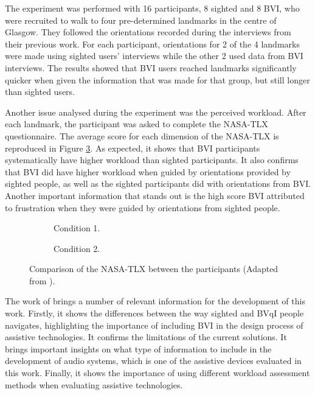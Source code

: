 The experiment was performed with 16 participants, 8 sighted and 8 BVI, who were recruited to walk to four pre-determined landmarks in the centre of Glasgow. They followed the orientations recorded during the interviews from their previous work. For each participant, orientations for 2 of the 4 landmarks were made using sighted users’ interviews while the other 2 used data from BVI interviews. The results showed that BVI users reached landmarks significantly quicker when given the information that was made for that group, but still longer than sighted users. 

Another issue analysed during the experiment was the perceived workload. After each landmark, the participant was asked to complete the NASA-TLX questionnaire. The average score for each dimension of the NASA-TLX is reproduced in Figure \ref{fig:bradley_2005_participants}. As expected, it shows that BVI participants systematically have higher workload than sighted participants. It also confirms that BVI did have higher workload when guided by orientations provided by sighted people, as well as the sighted participants did with orientations from BVI. Another important information that stands out is the high score BVI attributed to frustration when they were guided by orientations from sighted people. 


\begin{figure}[htbp]
    \centering
    \begin{subfigure}{.49\textwidth}
        \centering
        \resizebox{\linewidth}{!}{
        
        }
        \caption{Condition 1.}
        \label{fig:bradley_2005_nasa_participants_1}
    \end{subfigure}
    \hfill
    \begin{subfigure}{.49\textwidth}
        \centering
        \resizebox{\linewidth}{!}{
        
        }
        \caption{Condition 2.}
        \label{fig:bradley_2005_nasa_participants_2}
    \end{subfigure}
\caption{Comparison of the NASA-TLX between the participants (Adapted from ).}
\label{fig:bradley_2005_participants}
\end{figure}

The work of  brings a number of relevant information for the development of this work. Firstly, it shows the differences between the way sighted and BVqI people navigates, highlighting the importance of including BVI in the design process of assistive technologies. It confirms the limitations of the current solutions. It brings important insights on what type of information to include in the development of audio systems, which is one of the assistive devices evaluated in this work. Finally, it shows the importance of using different workload assessment methods when evaluating assistive technologies.
